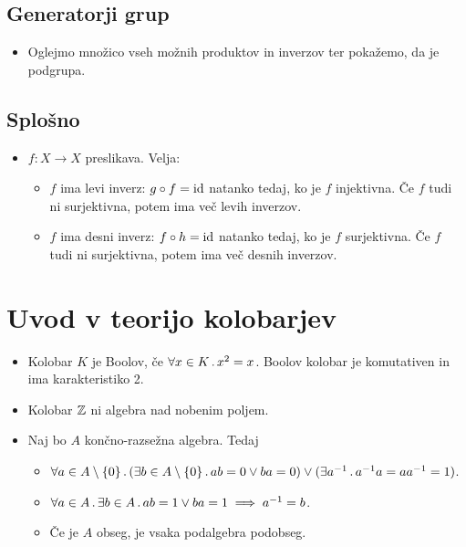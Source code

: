 \subsection{Generatorji grup}
\begin{itemize}
    \item Oglejmo množico vseh možnih produktov in inverzov ter pokažemo, da je podgrupa.
\end{itemize}

\subsection{Splošno}
\begin{itemize}
    \item \(f: X \to X\) preslikava. Velja:
    \begin{itemize}
        \item \(f\) ima levi inverz: \(g \circ f = \operatorname{id}\) natanko tedaj, ko je \(f\) injektivna. Če \(f\) tudi ni surjektivna, potem ima več levih inverzov.
        \item \(f\) ima desni inverz: \(f \circ h = \operatorname{id}\) natanko tedaj, ko je \(f\) surjektivna. Če \(f\) tudi ni surjektivna, potem ima več desnih inverzov.
    \end{itemize}
\end{itemize}

\section{Uvod v teorijo kolobarjev}
\begin{itemize}
    \item Kolobar \(K\) je Boolov, če \(\forall x \in K \,.\,x^2 = x\). Boolov kolobar je komutativen in ima karakteristiko 2. 
    \item Kolobar \(\mathbb{Z}\) ni algebra nad nobenim poljem.
    \item Naj bo \(A\) končno-razsežna algebra. Tedaj 
    \begin{itemize}
        \item \(\forall a \in A \setminus \{0\} \,.\, (\exists b \in A \setminus \{0\} \,.\, a b = 0 \lor ba = 0) \lor (\exists a^{-1} \,.\, a^{-1}a=aa^{-1} = 1)\).
        \item \(\forall a \in A \,.\, \exists b \in A \,.\, ab = 1 \lor ba = 1 \implies a^{-1} = b\).
        \item Če je \(A\) obseg, je vsaka podalgebra podobseg.
    \end{itemize}
\end{itemize}

